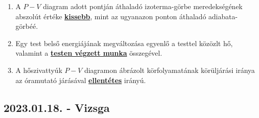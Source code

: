 \documentclass[../../fizika_kerdesek.tex]{subfiles}
\begin{document}
{\begin{enumerate}
                \item A $P-V$ diagram adott pontján áthaladó izoterma-görbe meredekségének abszolút értéke \underline{\textbf{kissebb}}, mint az ugyanazon ponton áthaladó adiabata-görbéé.
                \item Egy test belső energiájának megváltozása egyenlő a testtel közözlt hő, valamint a \underline{\textbf{testen végzett munka}} összegével.
                \item A hőszivattyúk $P-V$ diagramon ábrázolt körfolyamatának körüljárási iránya az óramutató járásával \underline{\textbf{ellentétes}} irányú.
            \end{enumerate}}

    \subsection{2023.01.18. - Vizsga}
\end{document}
